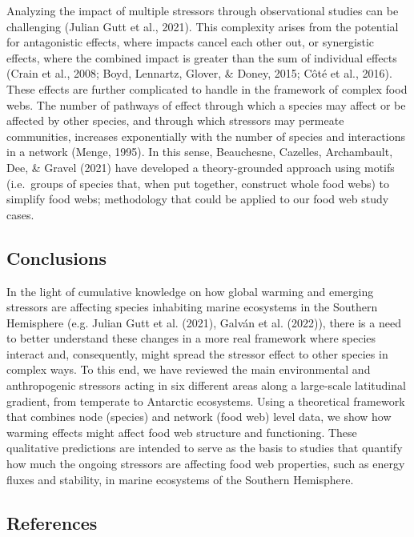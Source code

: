 \documentclass[
]{article}
\begin{document}
Analyzing the impact of multiple stressors through observational studies
can be challenging (Julian Gutt et al., 2021). This complexity arises
from the potential for antagonistic effects, where impacts cancel each
other out, or synergistic effects, where the combined impact is greater
than the sum of individual effects (Crain et al., 2008; Boyd, Lennartz,
Glover, \& Doney, 2015; Côté et al., 2016). These effects are further
complicated to handle in the framework of complex food webs. The number
of pathways of effect through which a species may affect or be affected
by other species, and through which stressors may permeate communities,
increases exponentially with the number of species and interactions in a
network (Menge, 1995). In this sense, Beauchesne, Cazelles, Archambault,
Dee, \& Gravel (2021) have developed a theory-grounded approach using
motifs (i.e.~groups of species that, when put together, construct whole
food webs) to simplify food webs; methodology that could be applied to
our food web study cases.

\hypertarget{conclusions}{%
\subsection{Conclusions}\label{conclusions}}

In the light of cumulative knowledge on how global warming and emerging
stressors are affecting species inhabiting marine ecosystems in the
Southern Hemisphere (e.g. Julian Gutt et al. (2021), Galván et al.
(2022)), there is a need to better understand these changes in a more
real framework where species interact and, consequently, might spread
the stressor effect to other species in complex ways. To this end, we
have reviewed the main environmental and anthropogenic stressors acting
in six different areas along a large-scale latitudinal gradient, from
temperate to Antarctic ecosystems. Using a theoretical framework that
combines node (species) and network (food web) level data, we show how
warming effects might affect food web structure and functioning. These
qualitative predictions are intended to serve as the basis to studies
that quantify how much the ongoing stressors are affecting food web
properties, such as energy fluxes and stability, in marine ecosystems of
the Southern Hemisphere.

\hypertarget{references}{%
\subsection*{References}\label{references}}
\end{document}
